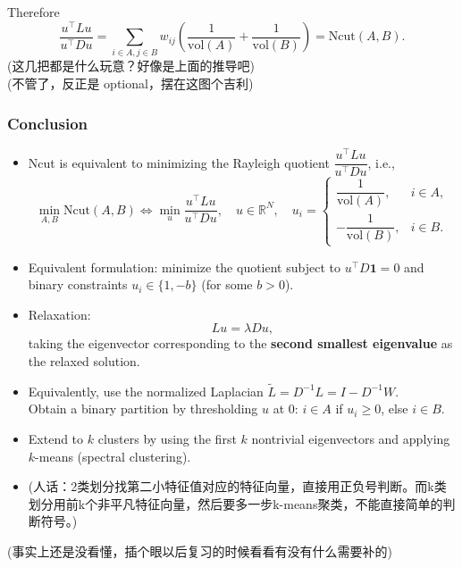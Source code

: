 \documentclass[UTF8]{ctexart}
\begin{document}
Therefore
\[
\frac{u^\top L u}{u^\top D u}=\sum_{i\in A, j\in B} w_{ij}\left(\frac{1}{\mathrm{vol}(A)}+\frac{1}{\mathrm{vol}(B)}\right)=\mathrm{Ncut}(A,B).
\]
(这几把都是什么玩意？好像是上面的推导吧)\\
(不管了，反正是 optional，摆在这图个吉利)

\subsubsection*{Conclusion}
\begin{itemize}
    \item Ncut is equivalent to minimizing the Rayleigh quotient $\dfrac{u^\top L u}{u^\top D u}$, i.e.,
    \[
    \min_{A,B}\mathrm{Ncut}(A,B)\iff \min_{u}\frac{u^\top L u}{u^\top D u},\quad u\in\mathbb{R}^N,\quad
    u_i=\begin{cases}\dfrac{1}{\mathrm{vol}(A)},&i\in A,\\[4pt]-\dfrac{1}{\mathrm{vol}(B)},&i\in B.\end{cases}
    \]
    \item Equivalent formulation: minimize the quotient subject to $u^\top D\mathbf{1}=0$ and binary constraints $u_i\in\{1,-b\}$ (for some $b>0$).
    \item Relaxation: 
    \[
    L u = \lambda D u,
    \]
    taking the eigenvector corresponding to the \textbf{second smallest eigenvalue} as the relaxed solution.
    \item Equivalently, use the normalized Laplacian $\widetilde{L}=D^{-1}L=I-D^{-1}W$.\\ Obtain a binary partition by thresholding $u$ at $0$: $i\in A$ if $u_i\ge0$, else $i\in B$.
    \item Extend to $k$ clusters by using the first $k$ nontrivial eigenvectors and applying $k$-means (spectral clustering).
    \item (人话：2类划分找第二小特征值对应的特征向量，直接用正负号判断。而k类划分用前k个非平凡特征向量，然后要多一步k-means聚类，不能直接简单的判断符号。)
\end{itemize}
(事实上还是没看懂，插个眼以后复习的时候看看有没有什么需要补的)
\end{document}
